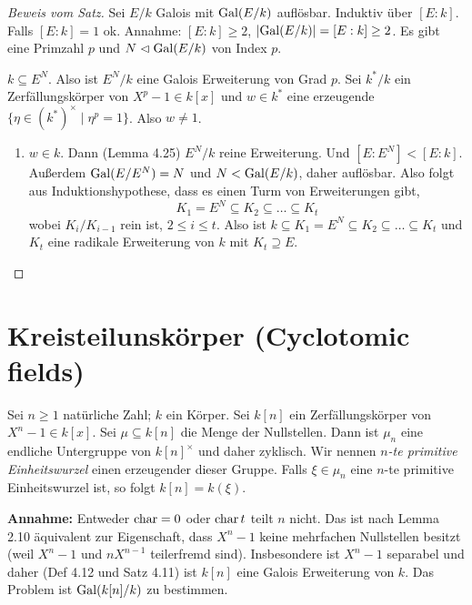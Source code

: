 \begin{proof}[Beweis vom Satz]
	Sei $E / k$ Galois mit $\operatorname{Gal}(E / k)$ auflösbar. 
	Induktiv über $[E:k]$. Falls $[E:k] = 1$ ok.
	Annahme: $[E:k] \geq 2$, $\abs{\operatorname{Gal}(E / k)} = [E:k] \geq 2$.
	Es gibt eine Primzahl $p$ und $N \vartriangleleft \operatorname{Gal}(E / k)$ von Index $p$.

	$k \subseteq E^{N}$. Also ist $E^{N} / k$ eine Galois Erweiterung von Grad $p$.
	Sei $k^{*} / k$ ein Zerfällungskörper von $X^{p}-1 \in k[x]$ und $w \in k^{*}$ eine erzeugende $\{\eta \in (k^{*})^{\times} \mid \eta^{p} = 1\}$. Also $w \neq 1$.

	\begin{enumerate}[{Fall} 1]
		\item $w \in k$. Dann (Lemma 4.25) $E^{N} / k$ reine Erweiterung. Und $[E:E^{N}] < [E:k]$.
			Außerdem $\operatorname{Gal}(E / E^{N}) = N$ und $N < \operatorname{Gal}(E / k)$, daher auflösbar.
			Also folgt aus Induktionshypothese, dass es einen Turm von Erweiterungen gibt,
			\[
			K_1 = E^{N} \subseteq K_2 \subseteq \ldots \subseteq K_{t}
			\] 
			wobei $K_{i} / K_{i-1}$ rein ist, $2 \leq i \leq t$.
			Also ist $k \subseteq K_1 = E^{N} \subseteq K_2 \subseteq \ldots \subseteq K_{t}$ und $K_{t}$ eine radikale Erweiterung von $k$ mit $K_{t} \supseteq E$.

	\end{enumerate}
\end{proof}

\section{Kreisteilunskörper (Cyclotomic fields)}

Sei $n \geq 1$ natürliche Zahl; $k$ ein Körper. Sei $k[n]$ ein Zerfällungskörper von $X^{n}-1 \in k[x]$.
Sei $\mu \subseteq k[n]$ die Menge der Nullstellen. Dann ist $\mu_{n}$ eine endliche Untergruppe von $k[n]^{\times}$ 
und daher zyklisch. Wir nennen \emph{$n$-te primitive Einheitswurzel} einen erzeugender dieser Gruppe.
Falls $\xi \in \mu_{n}$ eine $n$-te primitive Einheitswurzel ist, so folgt $k[n] = k(\xi)$.

\textbf{Annahme:} Entweder $\operatorname{char} = 0$ oder $\operatorname{char} t$ teilt $n$ nicht.
Das ist nach Lemma 2.10 äquivalent zur Eigenschaft, dass $X^{n}-1$ keine mehrfachen Nullstellen besitzt (weil $X^{n}-1$ und $n X^{n-1}$ teilerfremd sind).
Insbesondere ist $X^{n}-1$ separabel und daher (Def 4.12 und Satz 4.11) ist $k[n]$ eine Galois Erweiterung von $k$.
Das Problem ist $\operatorname{Gal}(k[n] / k)$ zu bestimmen.

